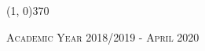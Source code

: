 \begin{titlepage}
\begin{adjustwidth}{-1cm}{-1cm}
\begin{center}
\begin{normalsize}
\begin{tabular}{l c r}
\end{tabular}
\end{normalsize}

\vspace{1.5cm}

\line(1, 0){370} \\
\begin{normalsize}
\textsc{Academic Year 2018/2019 - April 2020}
\end{normalsize}

\end{center}

\end{adjustwidth}
\end{titlepage}
